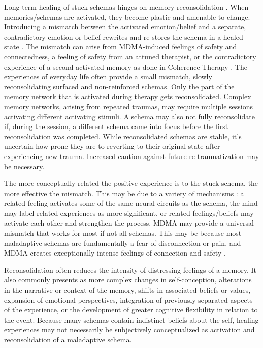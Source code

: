 \documentclass[12pt,letterpaper]{article}
\begin{document}
Long-term healing of stuck schemas hinges on memory reconsolidation \cite{fedduciaMDMAMemoryReconsolidation}. When memories/schemas are activated, they become plastic and amenable to change. Introducing a mismatch between the activated emotion/belief and a separate, contradictory emotion or belief rewrites and re-stores the schema in a healed state \cite{laneReconsolidation}. The mismatch can arise from MDMA-induced feelings of safety and connectedness, a feeling of safety from an attuned therapist, or the contradictory experience of a second activated memory as done in Coherence Therapy \cite{eckerUnlocking}. The experiences of everyday life often provide a small mismatch, slowly reconsolidating surfaced and non-reinforced schemas. Only the part of the memory network that is activated during therapy gets reconsolidated. Complex memory networks, arising from repeated traumas, may require multiple sessions activating different activating stimuli. A schema may also not fully reconsolidate if, during the session, a different schema came into focus before the first reconsolidation was completed. While reconsolidated schemas are stable, it's uncertain how prone they are to reverting to their original state after experiencing new trauma. Increased caution against future re-traumatization may be necessary.

The more conceptually related the positive experience is to the stuck schema, the more effective the mismatch. This may be due to a variety of mechanisms : a related feeling activates some of the same neural circuits as the schema, the mind may label related experiences as more significant, or related feelings/beliefs may activate each other and strengthen the process. MDMA may provide a universal mismatch that works for most if not all schemas. This may be because most maladaptive schemas are fundamentally a fear of disconnection or pain, and MDMA creates exceptionally intense feelings of connection and safety \cite{brownDaring}.

Reconsolidation often reduces the intensity of distressing feelings of a memory. It also commonly presents as more complex changes in self-conception, alterations in the narrative or context of the memory, shifts in associated beliefs or values, expansion of emotional perspectives, integration of previously separated aspects of the experience, or the development of greater cognitive flexibility in relation to the event. Because many schemas contain indistinct beliefs about the self, healing experiences may not necessarily be subjectively conceptualized as activation and reconsolidation of a maladaptive schema.
\end{document}
